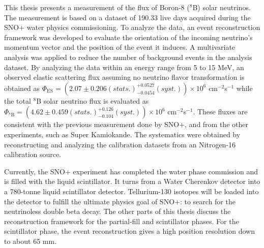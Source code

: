 This thesis presents a measurement of the flux of Boron-8 ($^8$B) solar neutrinos. The measurement is based on a dataset of 190.33 live days acquired during the SNO+ water physics commissioning. To analyze the data, an event reconstruction framework was developed to evaluate the orientation of the incoming neutrino's momentum vector and the position of the event it induces. A multivariate analysis was applied to reduce the number of background events in the analysis dataset. By analyzing the data within an energy range from 5 to 15 MeV, an observed elastic scattering flux assuming no neutrino flavor transformation is obtained as $\Phi_{\mathrm{ES}}=(2.07 \pm 0.206 (stats.)^{+0.0527}_{-0.0454}(syst.))\times10^6$ cm$^{-2}$s$^{-1}$ while the total $^8$B solar neutrino flux is evaluated as $\Phi_{\mathrm{^8B}}=(4.62 \pm 0.459 (stats.)^{+0.126}_{-0.104}(syst.))\times10^6$ cm$^{-2}$s$^{-1}$. These fluxes are consistent with the previous measurement done by SNO+\cite{anderson2019measurement}, and from the other experiments, such as Super Kamiokande\cite{abe2016solar}. The systematics were obtained by reconstructing and analyzing the calibration datasets from an Nitrogen-16 calibration source.

Currently, the SNO+ experiment has completed the water phase commission and is filled with the liquid scintillator. It turns from a Water Cherenkov detector into a 780-tonne liquid scintillator detector. Tellurium-130 isotopes will be loaded into the detector to fulfill the ultimate physics goal of SNO+: to search for the neutrinoless double beta decay. The other parts of this thesis discuss the reconstruction framework for the partial-fill and scintillator phases. For the scintillator phase, the event reconstruction gives a high position resolution down to about 65 mm. %